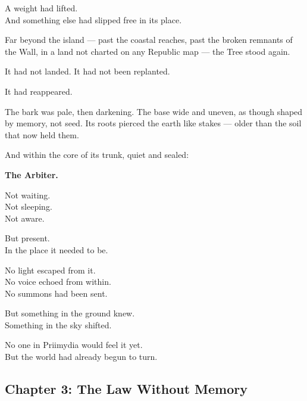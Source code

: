 \documentclass[9pt]{article}
\begin{document}
A weight had lifted.\\
And something else had slipped free in its place.

\vspace{1em}

Far beyond the island --- past the coastal reaches, past the broken remnants of the Wall, in a land not charted on any Republic map --- the Tree stood again.

It had not landed. It had not been replanted.

It had reappeared.

The bark was pale, then darkening. The base wide and uneven, as though shaped by memory, not seed. Its roots pierced the earth like stakes --- older than the soil that now held them.

And within the core of its trunk, quiet and sealed:

\textbf{The Arbiter.}

Not waiting.\\
Not sleeping.\\
Not aware.

But present.\\
In the place it needed to be.

No light escaped from it.\\
No voice echoed from within.\\
No summons had been sent.

But something in the ground knew.\\
Something in the sky shifted.

No one in Priimydia would feel it yet.\\
But the world had already begun to turn.

\newpage

\subsection*{Chapter 3: The Law Without Memory}

\vspace{1in}
\end{document}
